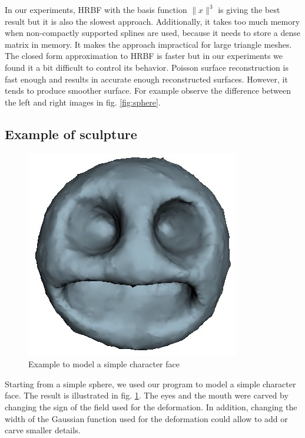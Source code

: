 \documentclass[ams]{U-AizuGT}
\begin{document}
% 
%
In our experiments, HRBF with the basis function $\|x\|^3$ is giving the best result 
but it is also the slowest approach. 
Additionally, it takes too much memory when non-compactly supported splines are used, 
because it needs to store a dense matrix in memory.
It makes the approach impractical for large triangle meshes. 
The closed form approximation to HRBF is faster but in our experiments 
we found it a bit difficult to control its behavior.
Poisson surface reconstruction is fast enough and results in accurate enough reconstructed surfaces. 
However, it tends to produce smoother surface. For example observe the difference between
the left and right images in fig. \ref{fig:sphere}.

\subsection{Example of sculpture}
\begin{figure}
  \centering\includegraphics[width=0.7\columnwidth]{simple_face_poisson-2.jpg}
  \caption{Example to model a simple character face} \label{fig:face}
\end{figure}
Starting from a simple sphere, we used our program to model a simple character face. 
The result is illustrated in fig. \ref{fig:face}.
The eyes and the mouth were carved by changing the sign of the field 
used for the deformation. 
In addition, changing the width of the Gaussian function used for the deformation 
could allow to add or carve smaller details.
\end{document}
